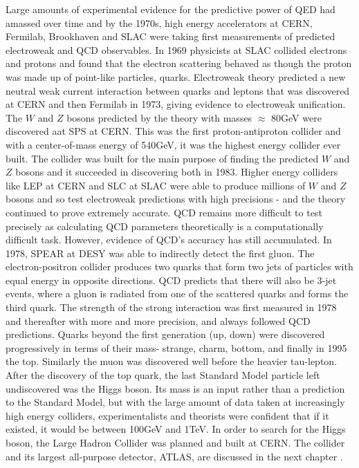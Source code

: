 Large amounts of experimental evidence for the predictive power of QED had amassed over time and by the 1970s, high energy accelerators at CERN, Fermilab, Brookhaven and SLAC were taking first measurements of predicted electroweak and QCD observables. In 1969 physicists at SLAC collided electrons and protons and found that the electron scattering behaved as though the proton was made up of point-like particles, quarks. Electroweak theory predicted a new neutral weak current interaction between quarks and leptons that was discovered at CERN and then Fermilab in 1973, giving evidence to electroweak unification. The $W$ and $Z$ bosons predicted by the theory with masses $\approx$ 80GeV were discovered aat SPS at CERN. This was the first proton-antiproton collider and with a center-of-mass energy of 540GeV, it was the highest energy collider ever built. The collider was built for the main purpose of finding the predicted $W$ and $Z$ bosons and it succeeded in discovering both in 1983. Higher energy colliders like LEP at CERN and SLC at SLAC were able to produce millions of $W$ and $Z$ bosons and so test electroweak predictions with high precisions - and the theory continued to prove extremely accurate. QCD remains more difficult to test precisely as calculating QCD parameters theoretically is a computationally difficult task. However, evidence of QCD's accuracy has still accumulated. In 1978, SPEAR at DESY was able to indirectly detect the first gluon. The electron-positron collider produces two quarks that form two jets of particles with equal energy in opposite directions. QCD predicts that there will also be 3-jet events, where a gluon is radiated from one of the scattered quarks and forms the third quark. The strength of the strong interaction was first measured in 1978 and thereafter with more and more precision, and always followed QCD predictions. Quarks beyond the first generation (up, down) were discovered progressively in terms of their mass- strange, charm, bottom, and finally in 1995 the top. Similarly the muon was discovered well before the heavier tau-lepton. After the discovery of the top quark, the last Standard Model particle left undiscovered was the Higgs boson. Its mass is an input rather than a prediction to the Standard Model, but with the large amount of data taken at increasingly high energy colliders, experimentalists and theorists were confident that if it existed, it would be between 100GeV and 1TeV. In order to search for the Higgs boson, the Large Hadron Collider was planned and built at CERN. The collider and its largest all-purpose detector, ATLAS, are discussed in the next chapter \cite{HistoryBook}. 

